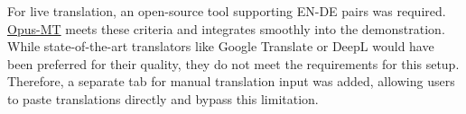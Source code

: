 For live translation, an open-source tool supporting EN-DE pairs was required. \href{https://github.com/Helsinki-NLP/Opus-MT}{Opus-MT} \citep{tiedemannOPUSMTBuildingOpen2020} meets these criteria and integrates smoothly into the demonstration. While state-of-the-art translators like Google Translate or DeepL would have been preferred for their quality, they do not meet the requirements for this setup. Therefore, a separate tab for manual translation input was added, allowing users to paste translations directly and bypass this limitation.